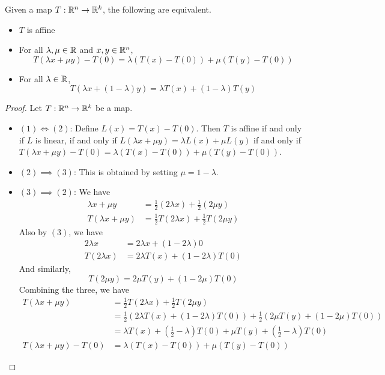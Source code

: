 \documentclass[a4paper]{article}
\begin{document}
\begin{prp}{}{} Given a map $T:\mathbb{R}^n\to\mathbb{R}^k$, the following are equivalent. 
\begin{itemize}
\item $T$ is affine
\item For all $\lambda,\mu\in\mathbb{R}$ and $x,y\in\mathbb{R}^n$, $$T(\lambda x+\mu y)-T(0)=\lambda(T(x)-T(0))+\mu(T(y)-T(0))$$
\item For all $\lambda\in\mathbb{R}$, $$T(\lambda x+(1-\lambda)y)=\lambda T(x)+(1-\lambda)T(y)$$
\end{itemize}\tcbline
\begin{proof} Let $T:\mathbb{R}^n\to\mathbb{R}^k$ be a map. 
\begin{itemize}
\item $(1)\iff(2)$: Define $L(x)=T(x)-T(0)$. Then $T$ is affine if and only if $L$ is linear, if and only if $L(\lambda x+\mu y)=\lambda L(x)+\mu L(y)$ if and only if $T(\lambda x+\mu y)-T(0)=\lambda(T(x)-T(0))+\mu(T(y)-T(0))$. 
\item $(2)\implies (3)$: This is obtained by setting $\mu=1-\lambda$. 
\item $(3)\implies (2)$: We have
\begin{align*}
\lambda x+\mu y&=\frac{1}{2}(2\lambda x)+\frac{1}{2}(2\mu y)\\
T(\lambda x+\mu y)&=\frac{1}{2}T(2\lambda x)+\frac{1}{2}T(2\mu y)\tag{By (3)}
\end{align*}
Also by $(3)$, we have
\begin{align*}
2\lambda x&=2\lambda x+(1-2\lambda)0\\
T(2\lambda x)&=2\lambda T(x)+(1-2\lambda)T(0)
\end{align*}
And similarly, $$T(2\mu y)=2\mu T(y)+(1-2\mu)T(0)$$
Combining the three, we have 
\begin{align*}
T(\lambda x+\mu y)&=\frac{1}{2}T(2\lambda x)+\frac{1}{2}T(2\mu y)\\
&=\frac{1}{2}(2\lambda T(x)+(1-2\lambda)T(0))+\frac{1}{2}(2\mu T(y)+(1-2\mu)T(0))\\
&=\lambda T(x)+\left(\frac{1}{2}-\lambda\right)T(0)+\mu T(y)+\left(\frac{1}{2}-\lambda\right)T(0)\\
T(\lambda x+\mu y)-T(0)&=\lambda(T(x)-T(0))+\mu(T(y)-T(0))
\end{align*}
\end{itemize}
\end{proof}
\end{prp}
\end{document}
